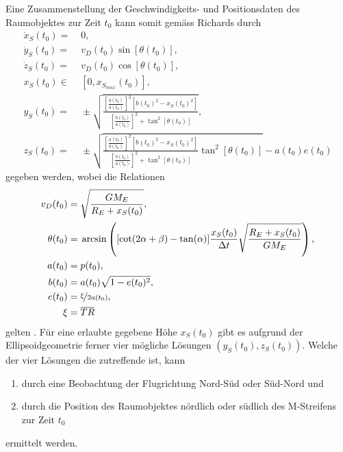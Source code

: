 \documentclass[a4paper,12pt]{article}
\numberwithin{equation}{section}
\begin{document}
Eine Zusammenstellung der Geschwindigkeits- und Positionsdaten des Raumobjektes zur Zeit $t_0$ kann somit gemäss Richards durch 
\begin{align}
\dot{x}_S(t_0) =&\; 0, \\
\dot{y}_S(t_0) =&\; v_D(t_0)\sin[\theta(t_0)], \\
\dot{z}_S(t_0) =&\; v_D(t_0)\cos[\theta(t_0)], \\
x_S(t_0) \in&\; [0, x_{S_{max}}(t_0)], \\
y_S(t_0) =&\; \pm \sqrt{\frac{\left[\frac{b(t_0)}{a(t_0)}\right]^2[b(t_0)^2-x_S(t_0)^2]}{\left[\frac{b(t_0)}{a(t_0)}\right]^2+\tan^2[\theta(t_0)]}}, \\
z_S(t_0) =&\; \pm \sqrt{\frac{\left[\frac{a(t_0)}{b(t_0)}\right]^2[b(t_0)^2-x_S(t_0)^2]}{\left[\frac{b(t_0)}{a(t_0)}\right]^2+\tan^2[\theta(t_0)]}\tan^2[\theta(t_0)]}-a(t_0)e(t_0)
\end{align} gegeben werden, wobei die Relationen \begin{align}
v_D(t_0) =&\; \sqrt{\frac{GM_E}{R_E+x_S(t_0)}}, \\
\theta(t_0) =&\; \arcsin\left([\cot(2\alpha+\beta)-\tan(\alpha)]\frac{x_S(t_0)}{\Delta t}\sqrt{\frac{R_E+x_S(t_0)}{GM_E}}\right), \\
a(t_0) =&\; p(t_0), \\
b(t_0) =&\; a(t_0)\sqrt{1-e(t_0)^2}, \\
e(t_0) =&\; \nicefrac{\xi}{2a(t_0)}, \\
\xi =&\; \overline{TR}
\end{align} gelten \cite[S.1732]{Richards.1961}. Für eine erlaubte gegebene Höhe $x_S(t_0)$ gibt es aufgrund der Ellipsoidgeometrie ferner vier mögliche Lösungen $(y_S(t_0),z_S(t_0))$. Welche der vier Lösungen die zutreffende ist, kann \begin{enumerate}
\item durch eine Beobachtung der Flugrichtung Nord-Süd oder Süd-Nord und 
\item durch die Position des Raumobjektes nördlich oder südlich des M-Streifens zur Zeit $t_0$
\end{enumerate} ermittelt werden. 
\end{document}
